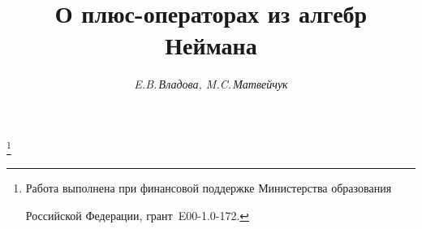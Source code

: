 






\newcommand{\pr}{\operatorname{pr}}


\newcommand{\re}{\operatorname{Re}}


\newcommand{\tts}[1]{}










\setcounter{page}{7}















\author{\it E.B.\,Владова, M.C.\,Матвейчук}




\title{О плюс-операторах из алгебр Неймана}


\thanks{Работа выполнена при финансовой поддержке Министерства образования


Российской Федерации, грант \No\,E00-1.0-172.}





\date{}




\pagestyle{plain} %







